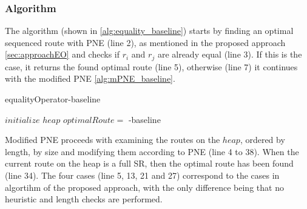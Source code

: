 \subsubsection{Algorithm}
The algorithm (shown in \ref{alg:equality_baseline}) starts by finding an optimal sequenced route with PNE (line 2), as mentioned in the proposed approach \ref{sec:approachEO} and checks if $r_i$ and $r_j$ are already equal (line 3). If this is the case, it returns the found optimal route (line 5), otherwise (line 7) it continues with the modified PNE \ref{alg:mPNE_baseline}. 

\begin{algorithm}[H]
	\label{alg:equality_baseline}
	\caption{equalityOperator-baseline}
	
	
	\BlankLine
	
	$initialize$ $heap$ 
	$optimalRoute =$\;
	{
		\modifiedPNE-baseline{}\;
	}
\end{algorithm}

Modified PNE proceeds with examining the routes on the $heap$, ordered by length, by size and modifying them according to PNE (line 4 to 38). When the current route on the heap is a full SR, then the optimal route has been found (line 34). The four cases (line 5, 13, 21 and 27) correspond to the cases in algortihm of the proposed approach, with the only difference being that no heuristic and length checks are performed. \newline

